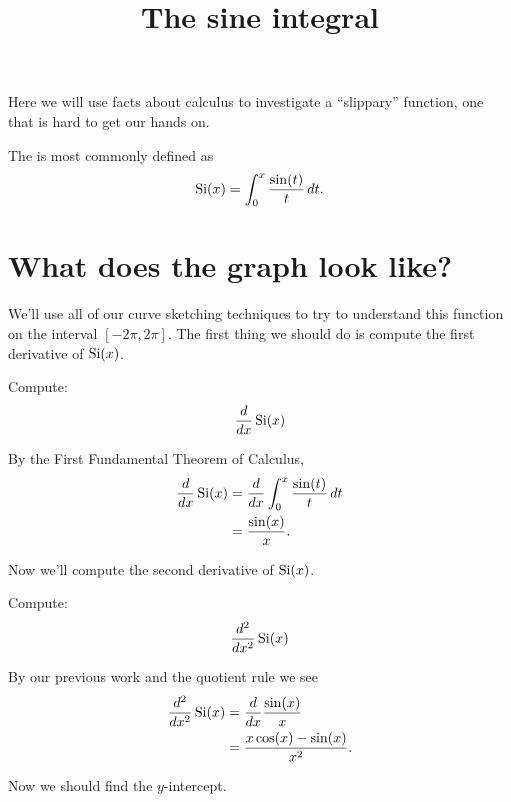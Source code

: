 \documentclass{ximera}
\title[Dig-In:]{The sine integral}
\begin{document}
\begin{abstract}
\end{abstract}
\maketitle

Here we will use facts about calculus to investigate a ``slippary''
function, one that is hard to get our hands on.

\begin{definition}
  The  is most commonly defined as
  \[
  \si(x) = \int_0^x \frac{\sin(t)}{t}\d t.
  \]
\end{definition}


\section{What does the graph look like?}

We'll use all of our curve sketching techniques to try to understand
this function on the interval $[-2\pi,2\pi]$.  The first thing we
should do is compute the first derivative of $\si(x)$.

\begin{example}
  Compute:
  \[
  \ddx \si(x)
  \]
  \begin{explanation}
    By the First Fundamental Theorem of Calculus,
    \begin{align*}
    \ddx \si(x) &= \ddx \int_0^x \frac{\sin(t)}{t}\d t\\
    &=\frac{\sin(x)}{x}.
    \end{align*}
  \end{explanation}
\end{example}

Now we'll compute the second derivative of $\si(x)$.

\begin{example}
  Compute:
  \[
  \dd[^2]{x^2}\si(x)
  \]
  \begin{explanation}
    By our previous work and the quotient rule we see
    \begin{align*}
      \dd[^2]{x^2} \si(x) &= \ddx \frac{\sin(x)}{x}\\
      &=\frac{x\cos(x) -\sin(x)}{x^2}.
    \end{align*}
  \end{explanation}
\end{example}

Now we should find the $y$-intercept.
\end{document}
